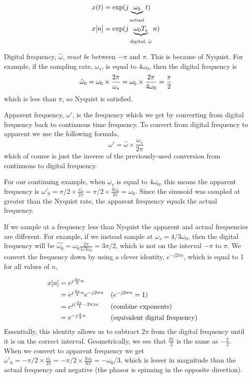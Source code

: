 \begin{align}
x(t) & = \exp(j\underbrace{\omega_0}_{\stackrel{}{\text{actual}}}t) \notag\\
x[n] & = \exp(j\underbrace{\omega_0 T_s}_{\stackrel{}{\text{digital, $\hat{\omega}$}}} n) \label{eq:samp-phasor-nyq}
\end{align}

Digital frequency, $\hat{\omega}$, \emph{must be} between $-\pi$ and $\pi$. This is because of Nyquist. For example, if the sampling rate, $\omega_s$, is equal to $4\omega_0$, then the digital frequency is
 \[
 \hat{\omega}_0=\omega_0 \times  \frac{2\pi}{\omega_s}=\omega_0\times \frac{2\pi}{4\omega_0}=\frac{\pi}{2} \notag 
 \]
which is less than $\pi$, so Nyquist is satisfied.

Apparent frequency, $\omega'$, is the frequency which we get by
converting from digital frequency back to continuous time
frequency. To convert from digital frequency to apparent we use the
following formula,
\begin{equation}
\omega' = \hat{\omega}\times \frac{\omega_s}{2\pi} \label{eq:conv-dig-app}
\end{equation}
which of course is just the inverse of the previously-used conversion
from continuous to digital frequency.

For our continuing example, when $\omega_s$ is equal to $4\omega_0$,
this means the apparent frequency is $\omega'_0=\pi/2\times
\frac{\omega_s}{2\pi}=\pi/2\times
\frac{4\omega_0}{2\pi}=\omega_0$. Since the sinusoid was sampled at
greater than the Nyquist rate, the apparent frequency equals the
actual frequency.

If we sample at a frequency less than Nyquist the apparent and actual frequencies are different. For example, if we instead sample at $\omega_s=4/3\omega_0$, then the digital frequency will be $\hat{\omega_0}=\omega_0 \frac{2\pi}{4/3\omega_0}=3\pi/2$, which is not on the interval  $-\pi$ to $\pi$. We convert the frequency down by using a clever identity, $e^{-j2\pi n}$, which is equal to 1 for all values of $n$,

\begin{align}
x[n] & = e^{j \frac{3\pi}{2}n} \notag\\
  & = e^{j \frac{3\pi}{2}n} e^{-j2\pi n} && (e^{-j2\pi n}=1)\notag\\
  & = e^{j (\frac{3\pi}{2} -2\pi)n} && (\text{combine exponents})\notag\\
  & = e^{-j \frac{\pi}{2}n} && (\text{equivalent digital frequency}) \notag
\end{align}
%
Essentially, this identity allows us to subtract $2\pi$ from the
digital frequency until it is on the correct interval. Geometrically,
we see that $\frac{3\pi}{2}$ is the same as $-\frac{\pi}{2}$. When we
convert to apparent frequency we get $\omega'_0=-\pi/2\times
\frac{\omega_s}{2\pi}=-\pi/2\times
\frac{4\omega_0}{6\pi}=-\omega_0/3$, which is lesser in magnitude than
the actual frequency and negative (the phasor is spinning in the
opposite direction).

